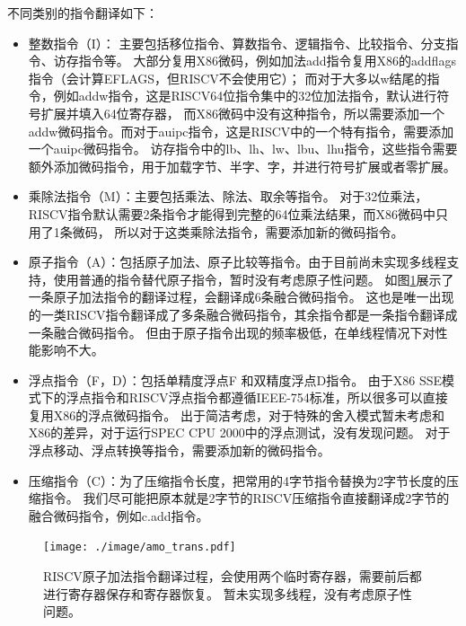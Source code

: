 不同类别的指令翻译如下：
\begin{itemize}
  \item 整数指令（I）： 主要包括移位指令、算数指令、逻辑指令、比较指令、分支指令、访存指令等。
          大部分复用X86微码，例如加法add指令复用X86的addflags指令（会计算EFLAGS，但RISCV不会使用它）；
          而对于大多以w结尾的指令，例如addw指令，这是RISCV64位指令集中的32位加法指令，默认进行符号扩展并填入64位寄存器，
          而X86微码中没有这种指令，所以需要添加一个addw微码指令。而对于auipc指令，这是RISCV中的一个特有指令，需要添加一个auipc微码指令。
          访存指令中的lb、lh、lw、lbu、lhu指令，这些指令需要额外添加微码指令，用于加载字节、半字、字，并进行符号扩展或者零扩展。

  \item 乘除法指令（M）：主要包括乘法、除法、取余等指令。
        对于32位乘法，RISCV指令默认需要2条指令才能得到完整的64位乘法结果，而X86微码中只用了1条微码，
        所以对于这类乘除法指令，需要添加新的微码指令。

  \item 原子指令（A）：包括原子加法、原子比较等指令。由于目前尚未实现多线程支持，使用普通的指令替代原子指令，暂时没有考虑原子性问题。
      如图\ref{img:amo_trans}展示了一条原子加法指令的翻译过程，会翻译成6条融合微码指令。
      这也是唯一出现的一类RISCV指令翻译成了多条融合微码指令，其余指令都是一条指令翻译成一条融合微码指令。
      但由于原子指令出现的频率极低，在单线程情况下对性能影响不大。

  \item 浮点指令（F，D）：包括单精度浮点F 和双精度浮点D指令。
        由于X86 SSE模式下的浮点指令和RISCV浮点指令都遵循IEEE-754标准，所以很多可以直接复用X86的浮点微码指令。
        出于简洁考虑，对于特殊的舍入模式暂未考虑和X86的差异，对于运行SPEC CPU 2000中的浮点测试，没有发现问题。
        对于浮点移动、浮点转换等指令，需要添加新的微码指令。

  \item 压缩指令（C）：为了压缩指令长度，把常用的4字节指令替换为2字节长度的压缩指令。
        我们尽可能把原本就是2字节的RISCV压缩指令直接翻译成2字节的融合微码指令，例如c.add指令。

\end{itemize}

\begin{figure}[!htbp]
  \centering
  \texttt{[image: ./image/amo\_trans.pdf]}
  \caption{RISCV原子加法指令翻译过程，会使用两个临时寄存器，需要前后都进行寄存器保存和寄存器恢复。
  暂未实现多线程，没有考虑原子性问题。}
  \label{img:amo_trans}
\end{figure}

